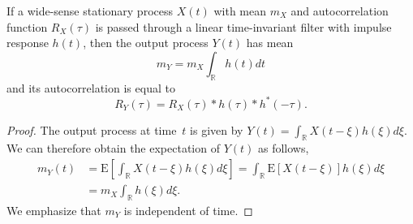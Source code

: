 \begin{theorem} \label{theorem:filteredWSS}
If a wide-sense stationary process $X(t)$ with mean $m_X$ and autocorrelation function $R_X(\tau)$ is passed through a linear time-invariant filter with impulse response $h(t)$, then the output process $Y(t)$ has mean
\begin{equation*}
m_Y = m_X \int_{\mathbb{R}} h(t) dt
\end{equation*}
and its autocorrelation is equal to
\begin{equation*}
R_Y (\tau) = R_X(\tau) \ast h(\tau) \ast h^*(-\tau) .
\end{equation*}
\end{theorem}
\begin{proof}
The output process at time~$t$ is given by $Y(t) = \int_{\mathbb{R}} X(t - \xi) h(\xi) d\xi$.
We can therefore obtain the expectation of $Y(t)$ as follows,
\begin{equation*}
\begin{split}
m_Y (t) &= \mathrm{E} \left[ \int_{\mathbb{R}} X(t - \xi) h(\xi) d\xi \right]
= \int_{\mathbb{R}} \mathrm{E} \left[ X(t - \xi) \right] h(\xi) d\xi \\
&= m_X \int_{\mathbb{R}} h(\xi) d\xi.
\end{split}
\end{equation*}
We emphasize that $m_Y$ is independent of time.


\end{proof}
